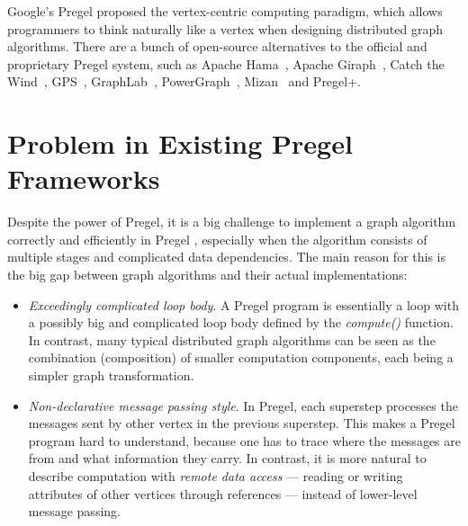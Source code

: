 \documentclass{sokendai_thesis} %
\begin{document}
Google's Pregel \cite{pregel} proposed the vertex-centric computing paradigm, which allows programmers to think naturally like a vertex when designing distributed graph algorithms.
There are a bunch of open-source alternatives to the official and proprietary Pregel system, such as Apache Hama~\cite{hama}, Apache Giraph~\cite{giraph}, Catch the Wind~\cite{catchw}, GPS~\cite{gps}, GraphLab~\cite{graphlab}, PowerGraph~\cite{powergraph}, Mizan~\cite{mizan} and Pregel+\cite{pregelplus}.

\section{Problem in Existing Pregel Frameworks}

Despite the power of Pregel, it is a big challenge to implement a graph algorithm correctly and efficiently in Pregel \cite{connectivity}, especially when the algorithm consists of multiple stages and complicated data dependencies.
The main reason for this is the big gap between graph algorithms and their actual implementations:

\begin{itemize}\setlength\itemsep{0em}
\item
 \textit{Exceedingly complicated loop body}.
 A Pregel program is essentially a loop with a possibly big and complicated loop body defined by the \emph{compute()} function.
 In contrast, many typical distributed graph algorithms can be seen as the combination (composition) of smaller computation components, each being a simpler graph transformation.
\item
 \textit{Non-declarative message passing style}.
 In Pregel, each superstep processes the messages sent by other vertex in the previous superstep.
 This makes a Pregel program hard to understand, because one has to trace where the messages are from and what information they carry.
 In contrast, it is more natural to describe computation with \emph{remote data access} --- reading or writing attributes of other vertices through references --- instead of lower-level message passing.
\end{itemize}
\end{document}
